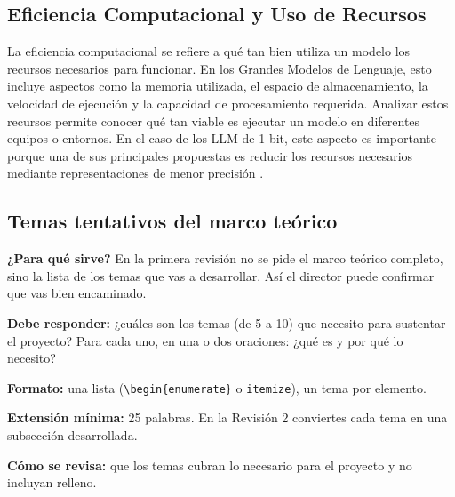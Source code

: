 \subsection{Eficiencia Computacional y Uso de Recursos}

La eficiencia computacional se refiere a qué tan bien utiliza un modelo los recursos necesarios para funcionar. En los Grandes Modelos de Lenguaje, esto incluye aspectos como la memoria utilizada, el espacio de almacenamiento, la velocidad de ejecución y la capacidad de procesamiento requerida. Analizar estos recursos permite conocer qué tan viable es ejecutar un modelo en diferentes equipos o entornos. En el caso de los LLM de 1-bit, este aspecto es importante porque una de sus principales propuestas es reducir los recursos necesarios mediante representaciones de menor precisión \cite{efficientLLMs}.

\subsection{Temas tentativos del marco teórico} \label{sec:temas_tentativos} %

\begin{guia}
\textbf{¿Para qué sirve?} En la primera revisión no se pide el marco teórico completo, sino la lista de los temas que
vas a desarrollar. Así el director puede confirmar que vas bien encaminado.

\textbf{Debe responder:} ¿cuáles son los temas (de 5 a 10) que necesito para sustentar el proyecto? Para cada uno, en una
o dos oraciones: ¿qué es y por qué lo necesito?

\textbf{Formato:} una lista (\verb|\begin{enumerate}| o \verb|itemize|), un tema por elemento.

\textbf{Extensión mínima:} 25 palabras. En la Revisión 2 conviertes cada tema en una subsección desarrollada.

\textbf{Cómo se revisa:} que los temas cubran lo necesario para el proyecto y no incluyan relleno.
\end{guia}


